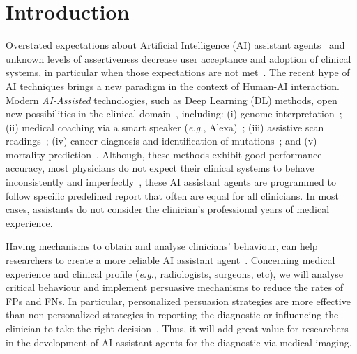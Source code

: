 \section{Introduction}
\label{sec:sec001}

Overstated expectations about Artificial Intelligence (AI) assistant agents~\cite{https://doi.org/10.13140/rg.2.2.25412.68486, https://doi.org/10.13140/rg.2.2.33421.59360} and unknown levels of assertiveness decrease user acceptance and adoption of clinical systems, in particular when those expectations are not met~\cite{Kocielnik:2019:YAI:3290605.3300641}.
The recent hype of AI techniques brings a new paradigm in the context of Human-AI interaction.
Modern {\it AI-Assisted} technologies, such as Deep Learning (DL) methods, open new possibilities in the clinical domain~\cite{topol2019high}, including:
(i) genome interpretation~\cite{sundaram2018predicting};
(ii) medical coaching via a smart speaker ({\it e.g.}, Alexa)~\cite{bickmore2018patient};
(iii) assistive scan readings~\cite{madani2018deep};
(iv) cancer diagnosis and identification of mutations~\cite{coudray2018classification}; and
(v) mortality prediction~\cite{ahmad2018death}.
Although, these methods exhibit good performance accuracy, most physicians do not expect their clinical systems to behave inconsistently and imperfectly~\cite{Kocielnik:2019:YAI:3290605.3300641}, these AI assistant agents are programmed to follow specific predefined report that often are equal for all clinicians.
In most cases, assistants do not consider the clinician's professional years of medical experience.


Having mechanisms to obtain and analyse clinicians' behaviour, can help researchers to create a more reliable AI assistant agent~\cite{Miao2019}.
Concerning medical experience and clinical profile ({\it e.g.}, radiologists, surgeons, etc), we will analyse critical behaviour and implement persuasive mechanisms to reduce the rates of FPs and FNs.
In particular, personalized persuasion strategies are more effective than non-personalized strategies in reporting the diagnostic or influencing the clinician to take the right decision~\cite{sonntag2016persuasive}.
Thus, it will add great value for researchers in the development of AI assistant agents for the diagnostic via medical imaging.

